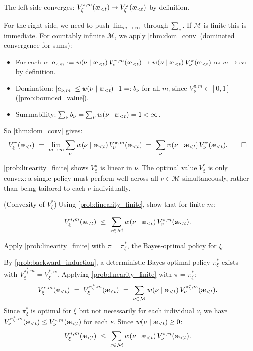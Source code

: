 \documentclass[fontsize=11pt, parskip=half]{scrartcl}
\newcommand{\cM}{\mathcal{M}}
\newcommand{\aes}{\textnormal{\ae}}
\begin{document}
\begin{solution}
The left side converges: $V_\xi^{\pi,m}(\aes_{<t}) \to V_\xi^\pi(\aes_{<t})$ by definition.

For the right side, we need to push $\lim_{m \to \infty}$ through $\sum_\nu$. If $\cM$ is finite this is immediate. For countably infinite $\cM$, we apply \cref{thm:dom_conv} (dominated convergence for sums):
\begin{itemize}\itemsep=2pt
    \item For each $\nu$: $a_{\nu,m} := w(\nu \mid \aes_{<t})\, V_\nu^{\pi,m}(\aes_{<t}) \to w(\nu \mid \aes_{<t})\, V_\nu^\pi(\aes_{<t})$ as $m \to \infty$ by definition.
    \item Domination: $|a_{\nu,m}| \leq w(\nu \mid \aes_{<t}) \cdot 1 =: b_\nu$ for all $m$, since $V_\nu^{\pi,m} \in [0,1]$ (\cref{prob:bounded_value}).
    \item Summability: $\sum_\nu b_\nu = \sum_\nu w(\nu \mid \aes_{<t}) = 1 < \infty$.
\end{itemize}
So \cref{thm:dom_conv} gives:
\[
    V_\xi^\pi(\aes_{<t})
    ~=~ \lim_{m \to \infty} \sum_\nu w(\nu \mid \aes_{<t})\, V_\nu^{\pi,m}(\aes_{<t})
    ~=~ \sum_\nu w(\nu \mid \aes_{<t})\, V_\nu^\pi(\aes_{<t}). \qedhere
\]
\end{solution}

\cref{prob:linearity_finite} shows $V_\xi^\pi$ is linear in $\nu$.
The optimal value $V_\xi^*$ is only convex: a single policy must perform well across all $\nu \in \cM$ simultaneously, rather than being tailored to each $\nu$ individually.

\begin{exercise}
\label{prob:convex_opt}
\skippable
(Convexity of $V_\xi^*$)
Using \cref{prob:linearity_finite}, show that for finite $m$:

\[
    V_\xi^{*,m}(\aes_{<t}) ~\leq~ \sum_{\nu \in \cM} w(\nu \mid \aes_{<t})\, V_\nu^{*,m}(\aes_{<t}).
\]
\begin{hint}
Apply \cref{prob:linearity_finite} with $\pi = \pi_\xi^*$, the Bayes-optimal policy for $\xi$.
\end{hint}
\end{exercise}

\begin{solution}
By \cref{prob:backward_induction}, a deterministic Bayes-optimal policy $\pi_\xi^*$ exists with $V_\xi^{\pi_\xi^*,m} = V_\xi^{*,m}$.
Applying \cref{prob:linearity_finite} with $\pi = \pi_\xi^*$:
\[
    V_\xi^{*,m}(\aes_{<t})
    ~=~ V_\xi^{\pi_\xi^*,m}(\aes_{<t})
    ~=~ \sum_{\nu \in \cM} w(\nu \mid \aes_{<t})\, V_\nu^{\pi_\xi^*,m}(\aes_{<t}).
\]
Since $\pi_\xi^*$ is optimal for $\xi$ but not necessarily for each individual $\nu$, we have $V_\nu^{\pi_\xi^*,m}(\aes_{<t}) \leq V_\nu^{*,m}(\aes_{<t})$ for each $\nu$.
Since $w(\nu \mid \aes_{<t}) \geq 0$:
\[
    V_\xi^{*,m}(\aes_{<t}) ~\leq~ \sum_{\nu \in \cM} w(\nu \mid \aes_{<t})\, V_\nu^{*,m}(\aes_{<t}).
\]
\end{solution}
\end{document}
